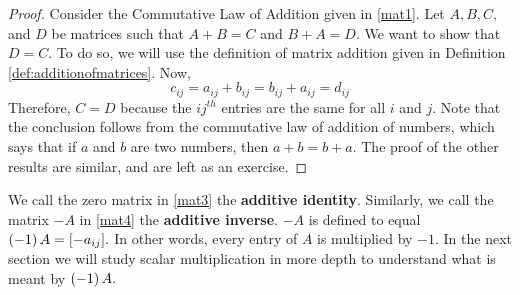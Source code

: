 \begin{proof}
Consider the Commutative Law of Addition given in \ref{mat1}. Let $A,B,C,$ and $D$ be matrices such that $A+B=C$ and 
$B+A=D.$ We want to show that $D=C$. To do so, we will use the definition of matrix addition given in Definition \ref{def:additionofmatrices}.
Now,
\begin{equation*}
c_{ij}=a_{ij}+b_{ij}=b_{ij}+a_{ij}=d_{ij}
\end{equation*}
Therefore, $C=D$ because the $ij^{th}$ entries are the same for all $i$ and $j$. Note that the
conclusion follows from the commutative law of addition of numbers, which says that if $a$ and $b$ are two numbers,
then $a+b = b+a$. 
The proof of the other results are similar, and are left as an exercise.
\end{proof}

We call the zero matrix in \ref{mat3} the \textbf{additive identity}. Similarly, we call the matrix $-A$
in \ref{mat4} the \textbf{additive inverse}. $-A$ is 
defined to equal $\left(-1\right) A = [-a_{ij}].$ In other words, every entry of $A$ is multiplied by $-1$.
In the next section we will study scalar multiplication in more depth 
to understand what is meant by  $\left(-1\right) A.$

